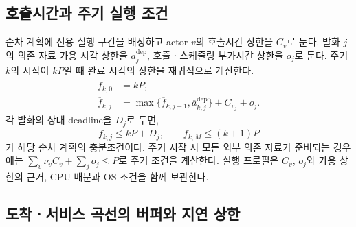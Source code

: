 \subsection{호출시간과 주기 실행 조건}

순차 계획에 전용 실행 구간을 배정하고 actor $v$의 호출시간 상한을 $C_v$로 둔다.
발화 $j$의 의존 자료 가용 시각 상한을 $\overline a_j^{\mathrm{dep}}$,
호출ㆍ스케줄링 부가시간 상한을 $o_j$로 둔다.
주기 $k$의 시작이 $kP$일 때 완료 시각의 상한을 재귀적으로 계산한다.
\begin{equation}
 \begin{aligned}
 \overline f_{k,0}&=kP,\\
 \overline f_{k,j}
 &=\max\{\overline f_{k,j-1},
                 \overline a_{k,j}^{\mathrm{dep}}\}
                 +C_{v_j}+o_j.
 \end{aligned}
 \label{eq:cyclic-response}
\end{equation}
각 발화의 상대 deadline을 $D_j$로 두면,
\begin{equation}
 \overline f_{k,j}\le kP+D_j,
 \qquad
 \overline f_{k,M}\le(k+1)P
 \label{eq:cyclic-deadline}
\end{equation}
가 해당 순차 계획의 충분조건이다.
주기 시작 시 모든 외부 의존 자료가 준비되는 경우에는
$\sum_v\nu_vC_v+\sum_jo_j\le P$로 주기 조건을 계산한다.
실행 프로필은 $C_v$, $o_j$와 가용 상한의 근거,
CPU 배분과 OS 조건을 함께 보관한다.

\subsection{도착ㆍ서비스 곡선의 버퍼와 지연 상한}

